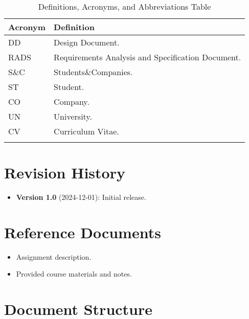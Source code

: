 \begin{longtable}{|l|p{}|}
    \hline
    \textbf{Acronym} & \textbf{Definition}                               \\
    \hline \hline
    DD               & Design Document.                                  \\
    \hline
    RADS             & Requirements Analysis and Specification Document. \\
    \hline
    S\&C             & Students\&Companies.                              \\
    \hline
    ST               & Student.                                          \\
    \hline
    CO               & Company.                                          \\
    \hline
    UN               & University.                                       \\
    \hline
    CV               & Curriculum Vitae.                                 \\
    \hline
    \caption{Definitions, Acronyms, and Abbreviations Table}
    \label{tab:definitions-acronyms-abbreviations}
\end{longtable}

\section{Revision History}
\label{sec:revision-history}%

\begin{itemize}
    \item \textbf{Version 1.0} (2024-12-01): Initial release.
\end{itemize}

\section{Reference Documents}
\label{sec:reference-documents}%

\begin{itemize}
    \item Assignment description.
    \item Provided course materials and notes.
\end{itemize}

\section{Document Structure}
\label{sec:document-structure}%

